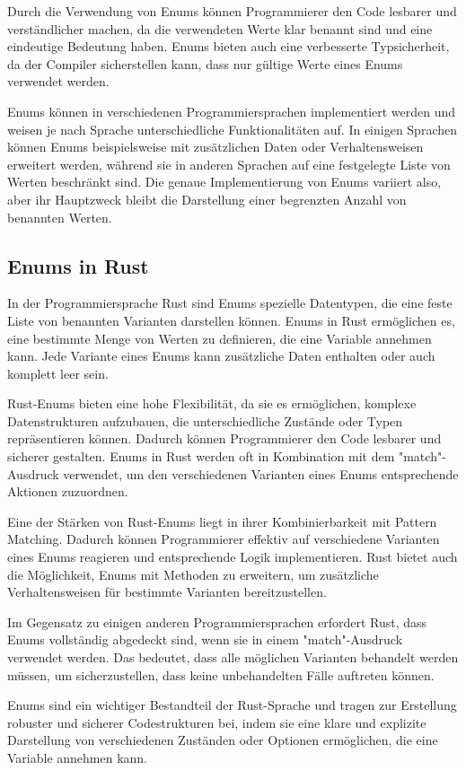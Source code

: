 \documentclass[a4paper, 1ppt]{article}
\begin{document}
Durch die Verwendung von Enums können Programmierer den Code lesbarer und verständlicher machen, da die verwendeten Werte klar benannt sind und eine eindeutige Bedeutung haben. Enums bieten auch eine verbesserte Typsicherheit, da der Compiler sicherstellen kann, dass nur gültige Werte eines Enums verwendet werden.

Enums können in verschiedenen Programmiersprachen implementiert werden und weisen je nach Sprache unterschiedliche Funktionalitäten auf. In einigen Sprachen können Enums beispielsweise mit zusätzlichen Daten oder Verhaltensweisen erweitert werden, während sie in anderen Sprachen auf eine festgelegte Liste von Werten beschränkt sind. Die genaue Implementierung von Enums variiert also, aber ihr Hauptzweck bleibt die Darstellung einer begrenzten Anzahl von benannten Werten.
\subsection{Enums in Rust}
In der Programmiersprache Rust sind Enums spezielle Datentypen, die eine feste Liste von benannten Varianten darstellen können. Enums in Rust ermöglichen es, eine bestimmte Menge von Werten zu definieren, die eine Variable annehmen kann. Jede Variante eines Enums kann zusätzliche Daten enthalten oder auch komplett leer sein.

Rust-Enums bieten eine hohe Flexibilität, da sie es ermöglichen, komplexe Datenstrukturen aufzubauen, die unterschiedliche Zustände oder Typen repräsentieren können. Dadurch können Programmierer den Code lesbarer und sicherer gestalten. Enums in Rust werden oft in Kombination mit dem "match"-Ausdruck verwendet, um den verschiedenen Varianten eines Enums entsprechende Aktionen zuzuordnen.

Eine der Stärken von Rust-Enums liegt in ihrer Kombinierbarkeit mit Pattern Matching. Dadurch können Programmierer effektiv auf verschiedene Varianten eines Enums reagieren und entsprechende Logik implementieren. Rust bietet auch die Möglichkeit, Enums mit Methoden zu erweitern, um zusätzliche Verhaltensweisen für bestimmte Varianten bereitzustellen.

Im Gegensatz zu einigen anderen Programmiersprachen erfordert Rust, dass Enums vollständig abgedeckt sind, wenn sie in einem "match"-Ausdruck verwendet werden. Das bedeutet, dass alle möglichen Varianten behandelt werden müssen, um sicherzustellen, dass keine unbehandelten Fälle auftreten können.

Enums sind ein wichtiger Bestandteil der Rust-Sprache und tragen zur Erstellung robuster und sicherer Codestrukturen bei, indem sie eine klare und explizite Darstellung von verschiedenen Zuständen oder Optionen ermöglichen, die eine Variable annehmen kann.
\end{document}
